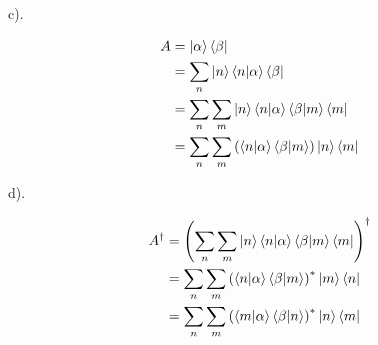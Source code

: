 \documentclass[a4paper,12pt]{article}
\begin{document}
\begin{minipage}[t]{0.9\textwidth}
  c).
  \begin{minipage}[t]{\textwidth}
    \begin{align*}
      A &= \ket{\alpha}\bra{\beta}\\
        &= \sum_n\ket{n}\braket{n|\alpha}\bra{\beta}\\
        &= \sum_n\sum_m\ket{n}\braket{n|\alpha}\braket{\beta|m}\bra{m}\\
        &= \sum_n\sum_m \left(\braket{n|\alpha}\braket{\beta|m}\right)\ket{n}\bra{m}
    \end{align*}
  \end{minipage}
\end{minipage}

\begin{minipage}[t]{\textwidth}
  d).
  \begin{minipage}[t]{\textwidth}
    \begin{align*}
      A^\dagger &= \left(\sum_n\sum_m\ket{n}\braket{n|\alpha}\braket{\beta|m}\bra{m}\right)^\dagger\\
                &= \sum_n\sum_m \left(\braket{n|\alpha}\braket{\beta|m}\right)^*\ket{m}\bra{n}\\
                &= \sum_n\sum_m \left(\braket{m|\alpha}\braket{\beta|n}\right)^*\ket{n}\bra{m}\\
    \end{align*}
  \end{minipage}
\end{minipage}
\end{document}
